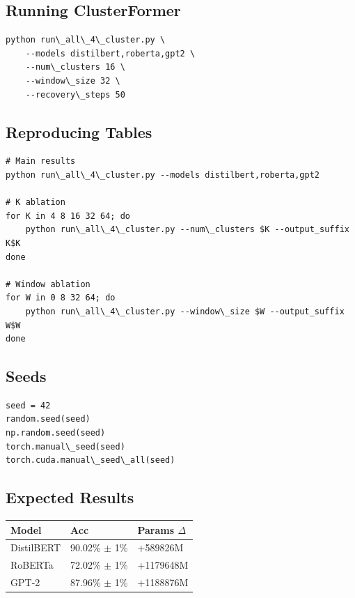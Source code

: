 \subsection{Running ClusterFormer}

\begin{lstlisting}
python run\_all\_4\_cluster.py \
    --models distilbert,roberta,gpt2 \
    --num\_clusters 16 \
    --window\_size 32 \
    --recovery\_steps 50
\end{lstlisting}

\subsection{Reproducing Tables}

\begin{lstlisting}
# Main results
python run\_all\_4\_cluster.py --models distilbert,roberta,gpt2

# K ablation
for K in 4 8 16 32 64; do
    python run\_all\_4\_cluster.py --num\_clusters $K --output_suffix K$K
done

# Window ablation
for W in 0 8 32 64; do
    python run\_all\_4\_cluster.py --window\_size $W --output_suffix W$W
done
\end{lstlisting}

\subsection{Seeds}

\begin{lstlisting}
seed = 42
random.seed(seed)
np.random.seed(seed)
torch.manual\_seed(seed)
torch.cuda.manual\_seed\_all(seed)
\end{lstlisting}

\subsection{Expected Results}

\begin{table}[H]
\centering
\small
\begin{tabular}{lll}
\toprule
\textbf{Model} & \textbf{Acc} & \textbf{Params $\Delta$} \\
\midrule
DistilBERT & 90.02\% $\pm$ 1\% & +589826M \\
RoBERTa & 72.02\% $\pm$ 1\% & +1179648M \\
GPT-2 & 87.96\% $\pm$ 1\% & +1188876M \\
\bottomrule
\end{tabular}
\end{table}

